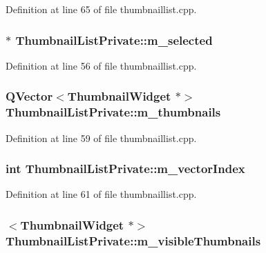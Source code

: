 Definition at line 65 of file thumbnaillist.\+cpp.

\hypertarget{classThumbnailListPrivate_a0b16f6278cb8bd930d7b484affe31bac}{
\subsubsection[{m\+\_\+selected}]{$\ast$ Thumbnail\+List\+Private\+::m\+\_\+selected}}\label{classThumbnailListPrivate_a0b16f6278cb8bd930d7b484affe31bac}


Definition at line 56 of file thumbnaillist.\+cpp.

\hypertarget{classThumbnailListPrivate_adc3638d1cfe0435440c400065ccd20af}{
\subsubsection[{m\+\_\+thumbnails}]{\setlength{\rightskip}{0pt plus 5cm}Q\+Vector$<${\bf Thumbnail\+Widget} $\ast$$>$ Thumbnail\+List\+Private\+::m\+\_\+thumbnails}}\label{classThumbnailListPrivate_adc3638d1cfe0435440c400065ccd20af}


Definition at line 59 of file thumbnaillist.\+cpp.

\hypertarget{classThumbnailListPrivate_a23212529d10b47411092e4ec45ffc2fe}{
\subsubsection[{m\+\_\+vector\+Index}]{\setlength{\rightskip}{0pt plus 5cm}int Thumbnail\+List\+Private\+::m\+\_\+vector\+Index}}\label{classThumbnailListPrivate_a23212529d10b47411092e4ec45ffc2fe}


Definition at line 61 of file thumbnaillist.\+cpp.

\hypertarget{classThumbnailListPrivate_a7cbd0afea7a3fc032f23a1854cd7df52}{
\subsubsection[{m\+\_\+visible\+Thumbnails}]{$<${\bf Thumbnail\+Widget} $\ast$$>$ Thumbnail\+List\+Private\+::m\+\_\+visible\+Thumbnails}}\label{classThumbnailListPrivate_a7cbd0afea7a3fc032f23a1854cd7df52}


